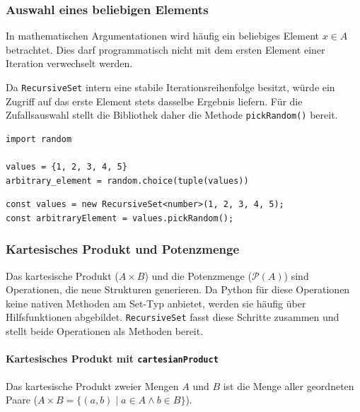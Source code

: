 \subsubsection{Auswahl eines beliebigen Elements}
\label{subsubsec:rs-api-pick-random}

In mathematischen Argumentationen wird häufig ein beliebiges Element \(x \in A\) betrachtet. Dies darf programmatisch nicht mit dem ersten Element einer Iteration verwechselt werden.

Da \texttt{RecursiveSet} intern eine stabile Iterationsreihenfolge besitzt, würde ein Zugriff auf das erste Element stets dasselbe Ergebnis liefern. Für die Zufallsauswahl stellt die Bibliothek daher die Methode \texttt{pickRandom()} bereit. 

\begin{listing}[ht]
    \caption{Auswahl eines Elements in Python und mit \texttt{RecursiveSet}}
    \label{lst:rs_pick_random_comparison}
    \begin{verbatim}
import random

values = {1, 2, 3, 4, 5}
arbitrary_element = random.choice(tuple(values))
    \end{verbatim}
    
    
    
    \begin{verbatim}
const values = new RecursiveSet<number>(1, 2, 3, 4, 5);
const arbitraryElement = values.pickRandom();
    \end{verbatim}
\end{listing}


\subsubsection{Kartesisches Produkt und Potenzmenge}
\label{subsubsec:rs-api-cartesian-powerset}

Das kartesische Produkt (\(A \times B\)) und die Potenzmenge (\(\mathcal{P}(A)\)) sind Operationen, die neue Strukturen generieren. Da Python für diese Operationen keine nativen Methoden am Set-Typ anbietet, werden sie häufig über Hilfsfunktionen abgebildet. \texttt{RecursiveSet} fasst diese Schritte zusammen und stellt beide Operationen als Methoden bereit.

\paragraph{Kartesisches Produkt mit \texttt{cartesianProduct}}
Das kartesische Produkt zweier Mengen \(A\) und \(B\) ist die Menge aller geordneten Paare (\(A \times B = \{(a,b) \mid a \in A \land b \in B\}\)). 

